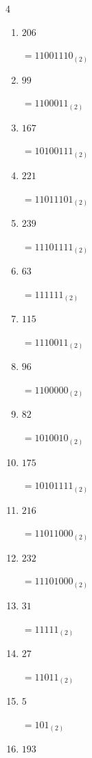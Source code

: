 \begin{multicols}{4}
\begin{enumerate}
        $=11111011_{(2)}$

  \item $206$

        $=11001110_{(2)}$

  \item $99$

        $=1100011_{(2)}$

  \item $167$

        $=10100111_{(2)}$

  \item $221$

        $=11011101_{(2)}$

  \item $239$

        $=11101111_{(2)}$

  \item $63$

        $=111111_{(2)}$

  \item $115$

        $=1110011_{(2)}$

  \item $96$

        $=1100000_{(2)}$

\columnbreak %

  \item $82$

        $=1010010_{(2)}$

  \item $175$

        $=10101111_{(2)}$

  \item $216$

        $=11011000_{(2)}$

  \item $232$

        $=11101000_{(2)}$

  \item $31$

        $=11111_{(2)}$

  \item $27$

        $=11011_{(2)}$

  \item $5$

        $=101_{(2)}$

  \item $193$


\end{enumerate}
\end{multicols}
